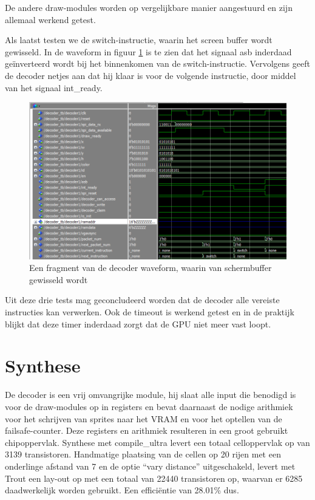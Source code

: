 \documentclass{scrartcl} %
\begin{document}
De andere draw-modules worden op vergelijkbare manier aangestuurd en zijn allemaal werkend getest.

Als laatst testen we de switch-instructie, waarin het screen buffer wordt gewisseld. In de waveform in figuur \ref{fig:decoder-modelsim-switch} is te zien dat het signaal asb inderdaad geïnverteerd wordt bij het binnenkomen van de switch-instructie. Vervolgens geeft de decoder netjes aan dat hij klaar is voor de volgende instructie, door middel van het signaal int\_ready.

\begin{figure}[H]
	\centering
	\includegraphics[width=\textwidth]{resource/decoder-modelsim-switch.png}
	\caption{Een fragment van de decoder waveform, waarin van schermbuffer gewisseld wordt}
	\label{fig:decoder-modelsim-switch}
\end{figure}

Uit deze drie tests mag geconcludeerd worden dat de decoder alle vereiste instructies kan verwerken. Ook de timeout is werkend getest en in de praktijk blijkt dat deze timer inderdaad zorgt dat de GPU niet meer vast loopt.

\section{Synthese}
De decoder is een vrij omvangrijke module, hij slaat alle input die benodigd is voor de draw-modules op in registers en bevat daarnaast de nodige arithmiek voor het schrijven van sprites naar het VRAM en voor het optellen van de failsafe-counter. Deze registers en arithmiek resulteren in een groot gebruikt chipoppervlak. Synthese met compile\_ultra levert een totaal celloppervlak op van 3139 transistoren. Handmatige plaatsing van de cellen op 20 rijen met een onderlinge afstand van 7 en de optie ``vary distance'' uitgeschakeld, levert met Trout een lay-out op met een totaal van 22440 transistoren op, waarvan er 6285 daadwerkelijk worden gebruikt. Een efficiëntie van 28.01\% dus.
\end{document}
